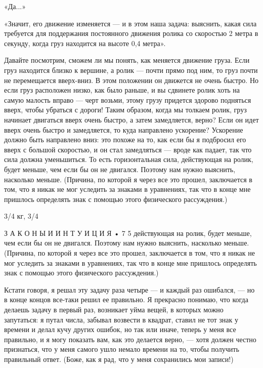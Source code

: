\documentclass[10pt,oneside]{article}
\begin{document}
«Да...»\par

«Значит, его движение изменяется --- и в этом наша задача: выяснить, какая сила требуется для поддержания постоянного движения ролика со скоростью 2 метра в секунду, когда груз находится на высоте 0,4 метра».\par

Давайте посмотрим, сможем ли мы понять, как меняется движение груза. Если груз находится близко к вершине, а ролик --- почти прямо под ним, то груз почти не перемещается вверх-вниз. В этом положении он движется не очень быстро. Но если груз расположен низко, как было раньше, и вы сдвинете ролик хоть на самую малость вправо --- черт возьми, этому грузу придется здорово подняться вверх, чтобы убраться с дороги! Таким образом, когда мы толкаем ролик, груз начинает двигаться вверх очень быстро, а затем замедляется, верно? Если он идет вверх очень быстро и замедляется, то куда направлено ускорение? Ускорение должно быть направлено вниз: это похоже на то, как если бы я подбросил его вверх с большой скоростью, и он стал замедляться --- вроде как падает, так что сила должна уменьшиться. То есть горизонтальная сила, действующая на ролик, будет меньше, чем если бы он не двигался. Поэтому нам нужно выяснить, насколько меньше. (Причина, по которой я через все это прошел, заключается в том, что я никак не мог уследить за знаками в уравнениях, так что в конце мне пришлось определять знак с помощью этого физического рассуждения.)\par

3/4 кг, 3/4\par

З А К О Н Ы  И  И Н Т У И Ц И Я • 7 5 действующая на ролик, будет меньше, чем если бы он не двигался. Поэтому нам нужно выяснить, насколько меньше. (Причина, по которой я через все это прошел, заключается в том, что я никак не мог уследить за знаками в уравнениях, так что в конце мне пришлось определять знак с помощью этого физического рассуждения.)\par

Кстати говоря, я решал эту задачу раза четыре --- и каждый раз ошибался, --- но в конце концов все-таки решил ее правильно. Я прекрасно понимаю, что когда делаешь задачу в первый раз, возникает уйма вещей, в которых можно запутаться: я путал числа, забывал возвести в квадрат, ставил не тот знак у времени и делал кучу других ошибок, но так или иначе, теперь у меня все правильно, и я могу показать вам, как это делается верно, --- хотя должен честно признаться, что у меня самого ушло немало времени на то, чтобы получить правильный ответ. (Боже, как я рад, что у меня сохранились мои записи!)\par
\end{document}
